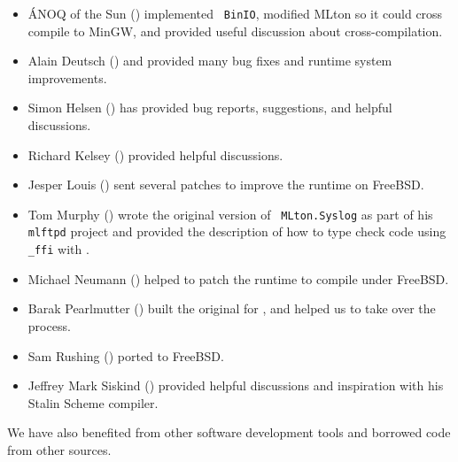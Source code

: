 \begin{itemize}

\item
\'{A}NOQ of the Sun () implemented {\tt
BinIO}, modified MLton so it could cross compile to MinGW, and provided useful
discussion about cross-compilation.

\item
Alain Deutsch () and  provided many bug fixes and
runtime system improvements.

\item
Simon Helsen () has provided bug reports, suggestions,
and helpful discussions.

\item
Richard Kelsey () provided helpful
discussions.

\item
Jesper Louis () sent several patches to improve
the runtime on FreeBSD.

\item
Tom Murphy () wrote the original version of {\tt
MLton.Syslog} as part of his {\tt mlftpd} project and provided the description
of how to type check code using {\tt \_ffi} with {\smlnj}.

\item
Michael Neumann () helped to patch the runtime
to compile under FreeBSD.

\item
Barak Pearlmutter () built the original
for {\mlton}, and helped us to take over the process.

\item
Sam Rushing () ported {\mlton} to FreeBSD.

\item
Jeffrey Mark Siskind () provided helpful discussions
and inspiration with his Stalin Scheme compiler.

\end{itemize}

We have also benefited from other software development tools and borrowed code
from other sources.

